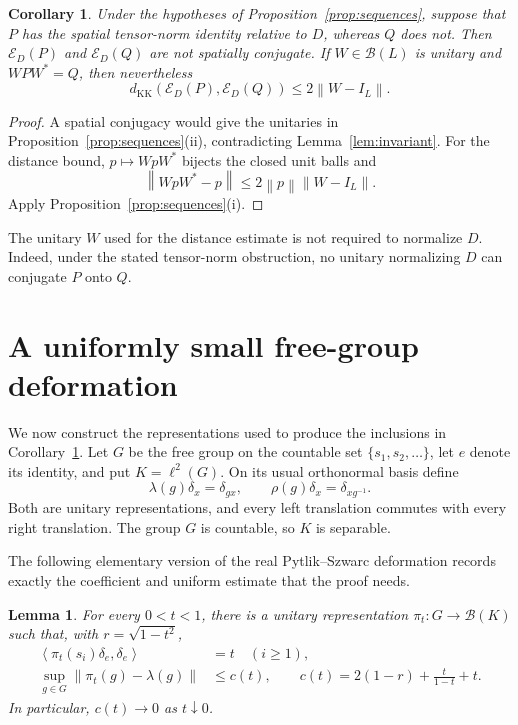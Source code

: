 \documentclass[11pt]{article}
\newtheorem{lemma}[theorem]{Lemma}
\newtheorem{corollary}[theorem]{Corollary}
\theoremstyle{definition}
\theoremstyle{remark}
\newcommand{\B}{\mathcal B}
\newcommand{\E}{\mathcal E}
\newcommand{\KK}{d_{\mathrm{KK}}}
\newcommand{\id}{I}
\newcommand{\norm}[1]{\left\|#1\right\|}
\newcommand{\inner}[2]{\left\langle #1,#2\right\rangle}
\begin{document}
\begin{corollary}\label{cor:obstruction}
Under the hypotheses of Proposition~\ref{prop:sequences}, suppose that
$P$ has the spatial tensor-norm identity relative to $D$, whereas $Q$
does not. Then $\E_D(P)$ and $\E_D(Q)$ are not spatially conjugate.
If $W\in\B(L)$ is unitary and $WPW^*=Q$, then nevertheless
\[
\KK(\E_D(P),\E_D(Q))\le2\norm{W-\id_L}.
\]
\end{corollary}

\begin{proof}
A spatial conjugacy would give the unitaries in
Proposition~\ref{prop:sequences}(ii), contradicting
Lemma~\ref{lem:invariant}. For the distance bound,
$p\mapsto WpW^*$ bijects the closed unit balls and
\[
\norm{WpW^*-p}\le2\norm{p}\norm{W-\id_L}.
\]
Apply Proposition~\ref{prop:sequences}(i).
\end{proof}

The unitary $W$ used for the distance estimate is not required to normalize $D$.
Indeed, under the stated tensor-norm obstruction, no unitary normalizing
$D$ can conjugate $P$ onto $Q$.

\section{A uniformly small free-group deformation}\label{sec:tree}

We now construct the representations used to produce the inclusions in
Corollary~\ref{cor:obstruction}. Let $G$ be the free group on the countable
set $\{s_1,s_2,\ldots\}$, let $e$ denote its identity, and put
$K=\ell^2(G)$. On its usual orthonormal basis define
\begin{equation}\label{eq:regular}
\lambda(g)\delta_x=\delta_{gx},\qquad
\rho(g)\delta_x=\delta_{xg^{-1}}.
\end{equation}
Both are unitary representations, and every left translation commutes
with every right translation. The group $G$ is countable, so $K$ is
separable.

The following elementary version of the real Pytlik--Szwarc deformation
\cite{PS86,BOT13} records exactly the coefficient and uniform estimate
that the proof needs.

\begin{lemma}\label{lem:tree}
For every $0<t<1$, there is a unitary representation $\pi_t:G\to\B(K)$
such that, with $r=\sqrt{1-t^2}$,
\begin{align}
\inner{\pi_t(s_i)\delta_e}{\delta_e}&=t\quad(i\ge1),\label{eq:coefficient}\\
\sup_{g\in G}\norm{\pi_t(g)-\lambda(g)}&\le c(t),\qquad
c(t)=2(1-r)+\frac{t}{1-t}+t.\label{eq:uniform}
\end{align}
In particular, $c(t)\to0$ as $t\downarrow0$.
\end{lemma}
\end{document}
